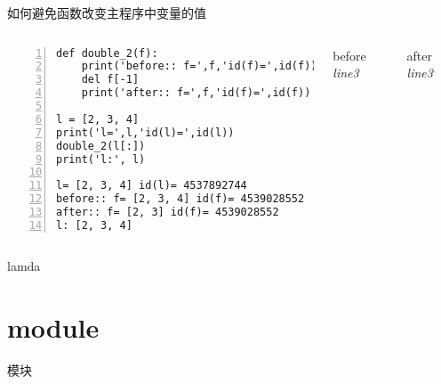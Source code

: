 \documentclass{beamer}
\begin{document}
\begin{frame}[fragile]{如何避免函数改变主程序中变量的值}
\begin{columns}
\begin{Verbatim}[numbers=left,frame=single,rulecolor=\color{red}]
def double_2(f):
    print('before:: f=',f,'id(f)=',id(f))
    del f[-1]
    print('after:: f=',f,'id(f)=',id(f))

l = [2, 3, 4]
print('l=',l,'id(l)=',id(l))
double_2(l[:])
print('l:', l)

l= [2, 3, 4] id(l)= 4537892744
before:: f= [2, 3, 4] id(f)= 4539028552
after:: f= [2, 3] id(f)= 4539028552
l: [2, 3, 4]
\end{Verbatim}
\begin{block}{before \textit{line3}}
\end{block}
\begin{block}{after \textit{line3}}
\end{block}

\end{columns}
\end{frame}
\begin{frame}{lamda}
\end{frame}
\section{module}
\begin{frame}{模块}
\end{frame}
\end{document}

